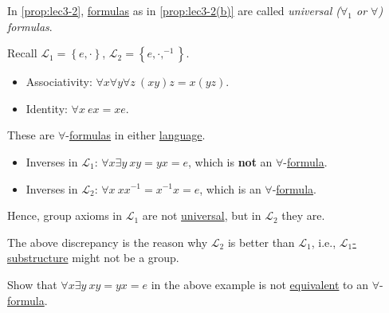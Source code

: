 \begin{notation}[Universal]\label{not:universal}
	In \autoref{prop:lec3-2}, \hyperref[def:formula]{formulas} as in \autoref{prop:lec3-2(b)} are called \emph{universal (\(\forall _1\) or \(\forall \)) formulas}.
\end{notation}

\begin{eg}
	Recall \(\mathcal{L} _1 = \left\{ e, \cdot \right\} \), \(\mathcal{L} _2=\left\{ e, \cdot, ^{-1} \right\} \).
	\begin{itemize}
		\item Associativity: \(\forall x \forall y \forall z\ (xy)z = x(yz)\).
		\item Identity: \(\forall x\ ex = xe\).
	\end{itemize}
	These are \(\forall \)-\hyperref[def:formula]{formulas} in either \hyperref[def:language]{language}.
	\begin{itemize}
		\item Inverses in \(\mathcal{L} _1\): \(\forall x \exists y\ xy = yx = e\), which is \textbf{not} an \(\forall \)-\hyperref[def:formula]{formula}.
		\item Inverses in \(\mathcal{L} _2\): \(\forall x\ x x ^{-1} = x ^{-1} x = e\), which is an \(\forall \)-\hyperref[def:formula]{formula}.
	\end{itemize}
	Hence, group axioms in \(\mathcal{L} _1\) are not \hyperref[not:universal]{universal}, but in \(\mathcal{L} _2\) they are.
\end{eg}

The above discrepancy is the reason why \(\mathcal{L} _2\) is better than \(\mathcal{L} _1\), i.e., \hyperref[def:substructure]{\(\mathcal{L} _1\)-substructure} might not be a group.

\begin{problem*}
	Show that \(\forall x \exists y\ xy = yx = e\) in the above example is not \hyperref[def:equivalent]{equivalent} to an \(\forall \)-\hyperref[def:formula]{formula}.
\end{problem*}